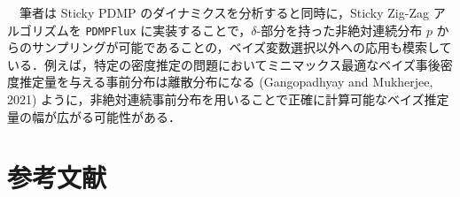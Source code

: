 \documentclass[
]{article}
\theoremstyle{StatementsWithUnderline}\newtheorem{theorem}{定理}[section]\newtheorem{definition}[theorem]{定義}\newtheorem{corollary}[theorem]{系}\newtheorem{proposition}[theorem]{命題}\newtheorem{lemma}[theorem]{補題}\newtheorem{example}[theorem]{例}
\theoremstyle{definition}\newtheorem{notation}[theorem]{記法}\newtheorem{algorithm}[theorem]{算譜}\newtheorem{remarks}[theorem]{要諦}\newtheorem{remark}[theorem]{注}
\begin{document}
　筆者は Sticky PDMP のダイナミクスを分析すると同時に，Sticky Zig-Zag
アルゴリズムを \texttt{PDMPFlux}
に実装することで，\(\delta\)-部分を持った非絶対連続分布 \(p\)
からのサンプリングが可能であることの，ベイズ変数選択以外への応用も模索している．例えば，特定の密度推定の問題においてミニマックス最適なベイズ事後密度推定量を与える事前分布は離散分布になる
(Gangopadhyay and Mukherjee, 2021)
ように，非絶対連続事前分布を用いることで正確に計算可能なベイズ推定量の幅が広がる可能性がある．

\section{参考文献}\label{ux53c2ux8003ux6587ux732e}

\setlength{\baselineskip}{1pt}

\label{refs}
\end{document}
